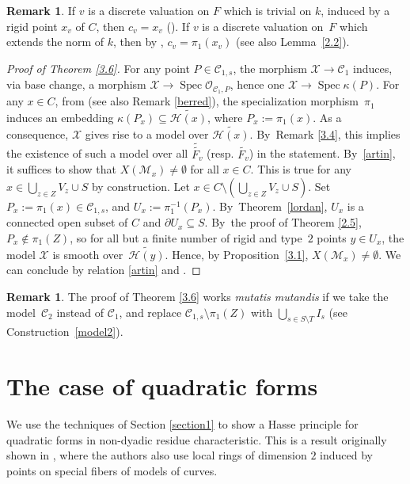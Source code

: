 \documentclass[JEP,XML,SOM,Unicode,NoFloatCountersInSection,published]{cedram}
\DeclareMathOperator{\Spec}{Spec}
\let\backslash\setminus
\theoremstyle{definition}
\newtheorem{rem}[thm]{Remark}
\begin{document}
\begin{rem} \label{3.7}
If $v$ is a discrete valuation on $F$ which is trivial on $k$, \ie induced by a rigid point $x_v$ of $C$, then $c_v=x_v$ (\cf \cite[Rem.\,8.3.19]{liulibri}).
If $v$ is a discrete valuation on~$F$ which extends the norm of $k$, then by \loccit, $c_v=\pi_1(x_v)$ (see also Lemma~\ref{2.2}).
\end{rem}

\begin{proof}[Proof of Theorem \ref{3.6}] For any point $P \in \mathscr{C}_{1,s}$,
the morphism $\mathcal{X} \to \mathscr{C}_1$ induces, via base change, a morphism $\mathcal{X} \to \Spec \mathcal{O}_{\mathscr{C}_1, P}$, hence one $\mathcal{X} \to \Spec \kappa(P)$. For any $x \in C$, from \cite[2.4, p.\,35]{Ber90} (see also Remark \ref{berred}), the specialization morphism~$\pi_1$ induces an embedding $\kappa(P_x) \subseteq \widetilde{\mathcal{H}(x)}$, where $P_x:=\pi_1(x)$. As a consequence, $\mathcal{X}$ gives rise to a model over $\widetilde{\mathcal{H}(x)}$. By~Remark \ref{3.4}, this implies the existence of such a model over all $\widetilde{\widetilde{F_v}}$ (resp. $\widetilde{F_v}$) in the statement. By~\eqref{artin}, it suffices to show that $X(\mathscr{M}_x) \neq \emptyset$ for all $x \in C$. This is true for any $x \in \bigcup_{z \in Z} V_z \cup S$ by construction. Let ${x \in C \backslash (\bigcup_{z \in Z} V_z \cup S)}$. Set $P_x:=\pi_1(x) \in \mathscr{C}_{1,s}$, and $U_x:=\pi_1^{-1}(P_x)$. By~Theorem~\ref{lordan}, $U_x$ is a connected open subset of $C$ and $\partial{U_x} \subseteq S$.
By~the proof of Theorem \ref{2.5}, $P_x \not \in \pi_1(Z)$, so for all but a finite number of rigid and type~$2$ points $y \in U_x$, the model $\mathcal{X}$ is smooth over~$\widetilde{\mathcal{H}(y)}$. Hence, by Proposition~\ref{3.1}, $X(\mathscr{M}_x) \neq \emptyset$. We can conclude by relation \eqref{artin} and \cite[Cor.\,3.18]{une}.
\end{proof}

\begin{rem}
The proof of Theorem \ref{3.6} works \emph{mutatis mutandis} if we take the model~$\mathscr{C}_2$ instead of $\mathscr{C}_1$, and replace $\mathscr{C}_{1,s} \backslash \pi_1(Z)$ with $\bigcup_{s \in S\backslash T} I_s$ (see Construction~\ref{model2}).
\end{rem}

\section{The case of quadratic forms} \label{quad}
We use the techniques of Section \ref{section1} to show a Hasse principle for quadratic forms in non-dyadic residue characteristic. This is a result originally shown in \cite[Th.\,3.1]{ctps}, where the authors also use local rings of dimension $2$ induced by points on special fibers of models of curves.
\end{document}
